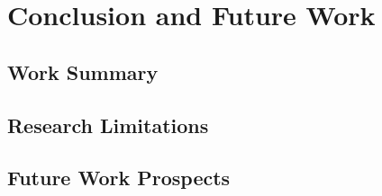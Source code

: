 \chapter{Conclusion and Future Work}
\label{cha:conclusion}

\section{Work Summary}
\label{sec:conclusion:summary}

\section{Research Limitations}
\label{sec:conclusion:limitations}

\section{Future Work Prospects}
\label{sec:conclusion:future_work}
